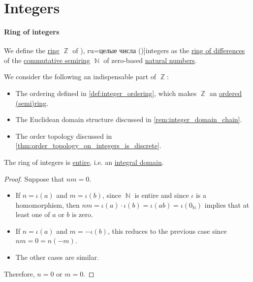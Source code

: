 \section{Integers}\label{sec:integers}

\paragraph{Ring of integers}

\begin{definition}\label{def:integers}\mimprovised
  We define the \hyperref[def:ring]{ring} \( \BbbZ \) of \term[bg=цели числа (\cite[374]{ГеновМиховскиМоллов1991Алгебра}), ru=целые числа (\cite[def. 20.1]{Проскуряков1951ТеоретическиеОсновыАрифметики})]{integers} as the \hyperref[def:ring_of_differences]{ring of differences} of the \hyperref[def:semiring/commutative]{commutative semiring} \( \BbbN \) of zero-based \hyperref[def:natural_numbers]{natural numbers}.
\end{definition}
\begin{comments}
  \item We consider the following an indispensable part of \( \BbbZ \):
  \begin{itemize}
    \item The ordering defined in \cref{def:integer_ordering}, which makes \( \BbbZ \) an \hyperref[def:ordered_semiring]{ordered (semi)ring}.
    \item The Euclidean domain structure discussed in \cref{rem:integer_domain_chain}.
    \item The order topology discussed in \cref{thm:order_topology_on_integers_is_discrete}.
  \end{itemize}
\end{comments}

\begin{proposition}\label{thm:integers_are_integral_domain}
  The ring of integers is \hyperref[def:entire_semiring]{entire}, i.e. an \hyperref[def:integral_domain]{integral domain}.
\end{proposition}
\begin{proof}
  Suppose that \( nm = 0 \).

  \begin{itemize}
    \item If \( n = \iota(a) \) and \( m = \iota(b) \), since \( \BbbN \) is entire and since \( \iota \) is a homomorphism, then \( nm = \iota(a) \cdot \iota(b) = \iota(ab) = \iota(0_\BbbN) \) implies that at least one of \( a \) or \( b \) is zero.
    \item If \( n = \iota(a) \) and \( m = -\iota(b) \), this reduces to the previous case since \( nm = 0 = n(-m) \).
    \item The other cases are similar.
  \end{itemize}

  Therefore, \( n = 0 \) or \( m = 0 \).
\end{proof}

